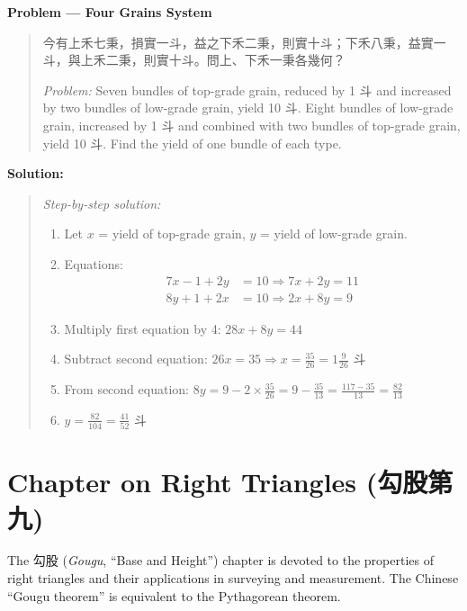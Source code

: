 \documentclass[11pt,a4paper]{article}
\newcommand{\zh}[1]{{#1}}
\newenvironment{chproblem}[1][]{%
  \par\medskip\noindent\textbf{\textcolor{sectioncolor}{#1}}\par\nopagebreak
  \begin{quote}\small
}{%
  \end{quote}\medskip
}
\newenvironment{chsolution}{%
  \par\medskip\noindent\textbf{\textcolor{notecolor}{Solution:}}\par\nopagebreak
  \begin{quote}\small
}{%
  \end{quote}\medskip
}
\newenvironment{stepbystep}{%
  \par\smallskip\noindent\textit{Step-by-step solution:}\par\nopagebreak
  \begin{enumerate}[leftmargin=2em,label=\textbf{Step \arabic*:},ref=\arabic*]
}{%
  \end{enumerate}\medskip
}
\begin{document}
\begin{chproblem}[Problem --- Four Grains System]
\zh{今有上禾七秉，損實一斗，益之下禾二秉，則實十斗；下禾八秉，益實一斗，與上禾二秉，則實十斗。問上、下禾一秉各幾何？}

\medskip
\textit{Problem:} Seven bundles of top-grade grain, reduced by 1 \zh{斗} and
increased by two bundles of low-grade grain, yield 10 \zh{斗}. Eight bundles
of low-grade grain, increased by 1 \zh{斗} and combined with two bundles of
top-grade grain, yield 10 \zh{斗}. Find the yield of one bundle of each type.
\end{chproblem}

\begin{chsolution}
\begin{stepbystep}
\item Let $x$ = yield of top-grade grain, $y$ = yield of low-grade grain.

\item Equations:
\begin{align*}
7x - 1 + 2y &= 10 \Rightarrow 7x + 2y = 11 \\
8y + 1 + 2x &= 10 \Rightarrow 2x + 8y = 9
\end{align*}

\item Multiply first equation by 4: $28x + 8y = 44$

\item Subtract second equation: $26x = 35 \Rightarrow x = \frac{35}{26} = 1\frac{9}{26}$ \zh{斗}

\item From second equation: $8y = 9 - 2 \times \frac{35}{26} = 9 - \frac{35}{13} = \frac{117 - 35}{13} = \frac{82}{13}$

\item $y = \frac{82}{104} = \frac{41}{52}$ \zh{斗}
\end{stepbystep}
\end{chsolution}

\newpage

\section{Chapter on Right Triangles (\zh{勾股第九})}
\label{sec:gougu}

The \zh{勾股} (\textit{Gougu}, ``Base and Height'') chapter is devoted to
the properties of right triangles and their applications in surveying and
measurement. The Chinese ``Gougu theorem'' is equivalent to the Pythagorean
theorem.
\end{document}
